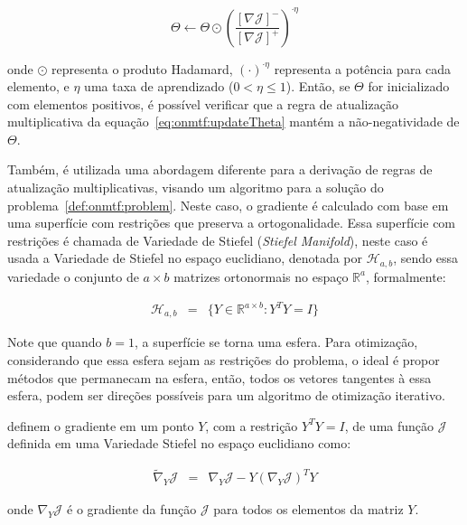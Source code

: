 \documentclass[
    12pt,                %
    oneside,            %
    a4paper,            %
    english,            %
    brazil                %
    ]{abntex2ppgsi}
\begin{document}
\begin{equation}
\label{eq:onmtf:updateTheta}
    \Theta \gets \Theta \odot \left ( \frac{ [\nabla \mathcal{J}]^- }{ [\nabla \mathcal{J}]^+ } \right )^{\cdot \eta}
\end{equation}

onde $\odot$ representa o produto Hadamard, $(\cdot)^{\cdot \eta}$ representa a potência para cada elemento, e $\eta$ uma taxa de aprendizado ($0 < \eta \leq 1$).
Então, se $\Theta$ for inicializado com elementos positivos, é possível verificar que a regra de atualização multiplicativa da equação~\ref{eq:onmtf:updateTheta} mantém a não-negatividade de $\Theta$.

Também, é utilizada uma abordagem diferente para a derivação de regras de atualização multiplicativas, visando um algoritmo para a solução do problema~\ref{def:onmtf:problem}.
Neste caso, o gradiente é calculado com base em uma superfície com restrições que preserva a ortogonalidade.
Essa superfície com restrições é chamada de Variedade de Stiefel (\textit{Stiefel Manifold}), neste caso é usada a Variedade de Stiefel no espaço euclidiano, denotada por $\mathcal{H}_{a,b}$, sendo essa variedade o conjunto de $a \times b$ matrizes ortonormais no espaço $\mathbb{R}^a$, formalmente:

\[
    \begin{array}{lclcl}
        \mathcal{H}_{a, b} & = & \{ Y \in \mathbb{R}^{a \times b}: Y^T Y = I \}
    \end{array}
\]

Note que quando $b = 1$, a superfície se torna uma esfera.
Para otimização, considerando que essa esfera sejam as restrições do problema, o ideal é propor métodos que permanecam na esfera, então, todos os vetores tangentes à essa esfera, podem ser direções possíveis para um algoritmo de otimização iterativo.

 definem o gradiente em um ponto $Y$, com a restrição $Y^T Y = I$, de uma função $\mathcal{J}$ definida em uma Variedade Stiefel no espaço euclidiano como:

\begin{equation}
\label{eq:stiefeldiff}
    \begin{array}{lclcl}
        {\tilde \nabla}_Y \mathcal{J} & = & \nabla_Y \mathcal{J} - Y (\nabla_Y \mathcal{J})^T Y
    \end{array}
\end{equation}

onde $\nabla_Y \mathcal{J}$ é o gradiente da função $\mathcal{J}$ para todos os elementos da matriz $Y$.
\end{document}
